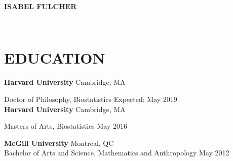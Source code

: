 \documentclass[12pt]{article}
\begin{document}
\newcommand{\MYhref}[3][blue]{\href{#2}{\color{#1}{#3}}}%
	\begin{center}
	\textbf{
			{\huge I}{\Large SABEL} \hspace{-0.1em} 
			{\huge F}{\Large ULCHER}}\\
\end{center}
\begin{minipage}[t]{0.5\linewidth}
\begin{flushleft}
     \MYhref[black]{mailto:isabelfulcher@g.harvard.edu}{isabelfulcher@g.harvard.edu} \\
    \MYhref[black]{http://orcid.org/0000-0002-1209-824X}{ORCID: 0000-0002-1209-824X} 
         \end{flushleft}
\end{minipage}
\begin{minipage}[t]{0.5\linewidth} 
    \begin{flushright}  
    {\LARGE
  \href{http://isabelfulcher.github.io}{\faFirefox} \href{https://github.com/isabelfulcher}{\faGithub}  \href{https://scholar.google.com/citations?user=0-9RLbQAAAAJ&hl=en}{\faGoogle} \href{https://twitter.com/isabelfulcher}{\faTwitter} \href{mailto:isabelfulcher@g.harvard.edu}{\faEnvelope }   \par
    }
    \end{flushright}  
\end{minipage}


\section*{\textbf{{\Large E}{\small DUCATION}}}

\textbf{Harvard University} \hfill \hfill Cambridge, MA

Doctor of Philosophy, Biostatistics \hfill \hfill Expected: May 2019 \\

\textbf{Harvard University} \hfill \hfill Cambridge, MA

Masters of Arts, Biostatistics \hfill \hfill May 2016

\vspace{.5cm}

\textbf{McGill University} \hfill \hfill Montreal, QC \\
Bachelor of Arts and Science, Mathematics and Anthropology \hfill \hfill May 2012 \\
\end{document}
